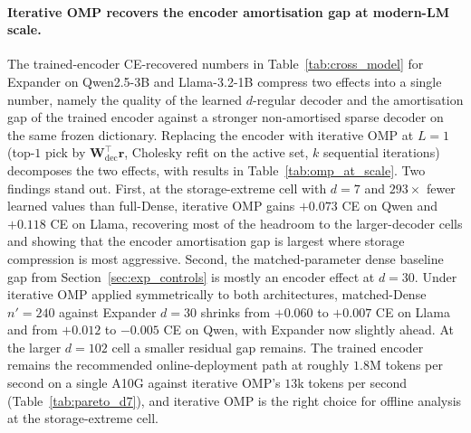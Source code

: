 \documentclass{article}
\theoremstyle{plain}
\theoremstyle{definition}
\theoremstyle{remark}
\begin{document}
\paragraph{Iterative OMP recovers the encoder amortisation gap at modern-LM scale.}
The trained-encoder CE-recovered numbers in Table~\ref{tab:cross_model} for Expander on Qwen2.5-3B and Llama-3.2-1B compress two effects into a single number, namely the quality of the learned $d$-regular decoder and the amortisation gap of the trained encoder against a stronger non-amortised sparse decoder on the same frozen dictionary. Replacing the encoder with iterative OMP at $L{=}1$ (top-$1$ pick by $\mathbf{W}_{\mathrm{dec}}^\top \mathbf{r}$, Cholesky refit on the active set, $k$ sequential iterations) decomposes the two effects, with results in Table~\ref{tab:omp_at_scale}. Two findings stand out. First, at the storage-extreme cell with $d{=}7$ and $293\times$ fewer learned values than full-Dense, iterative OMP gains $+0.073$ CE on Qwen and $+0.118$ CE on Llama, recovering most of the headroom to the larger-decoder cells and showing that the encoder amortisation gap is largest where storage compression is most aggressive. Second, the matched-parameter dense baseline gap from Section~\ref{sec:exp_controls} is mostly an encoder effect at $d{=}30$. Under iterative OMP applied symmetrically to both architectures, matched-Dense $n'{=}240$ against Expander $d{=}30$ shrinks from $+0.060$ to $+0.007$ CE on Llama and from $+0.012$ to $-0.005$ CE on Qwen, with Expander now slightly ahead. At the larger $d{=}102$ cell a smaller residual gap remains. The trained encoder remains the recommended online-deployment path at roughly $1.8$M tokens per second on a single A10G against iterative OMP's $13$k tokens per second (Table~\ref{tab:pareto_d7}), and iterative OMP is the right choice for offline analysis at the storage-extreme cell.
\end{document}
